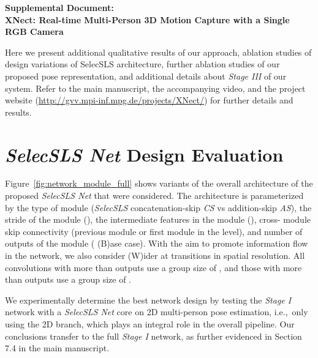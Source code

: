 \documentclass[acmtog,authorversion]{acmart}
\newcommand{\ie}{i.e.,~}
\begin{document}
\clearpage
\begin{center}
 \textbf{\large Supplemental Document:\\XNect: Real-time Multi-Person 3D Motion Capture with a Single RGB Camera}
 \end{center}
 \setcounter{equation}{0}
 \setcounter{figure}{0}
 \setcounter{table}{0}
 \setcounter{section}{0}


Here we present additional qualitative results of our approach, ablation studies of design variations of SelecSLS architecture, further ablation studies of our proposed pose representation, and additional details about \textit{Stage III} of our system. Refer to the main manuscript, the accompanying video, and the project website (\url{http://gvv.mpi-inf.mpg.de/projects/XNect/}) for further details and results.

\section{\textit{SelecSLS Net} Design Evaluation}
\label{sec:dlnas_net}
Figure~\ref{fig:network_module_full} shows variants of the overall architecture of the proposed \textit{SelecSLS Net} that were considered. The architecture is parameterized by the type of module (\textit{SelecSLS} concatenation-skip \textit{CS} vs addition-skip \textit{AS}), the stride of the module (), the intermediate features in the module (), cross- module skip connectivity (previous module or first module in the level), and number of outputs of the module ( (B)ase case). With the aim to promote information flow in the network, we also consider (W)ider  at transitions in spatial resolution. All  convolutions with more than  outputs use a group size of , and those with more than  outputs use a group size of .

We experimentally determine the best network design by testing the \textit{Stage I} network with a \textit{SelecSLS Net} core on 2D multi-person pose estimation, \ie only using the 2D branch, which plays an integral role in the overall pipeline. Our conclusions transfer to the full \textit{Stage I} network, as further evidenced in Section 7.4 in the main manuscript.
\end{document}
